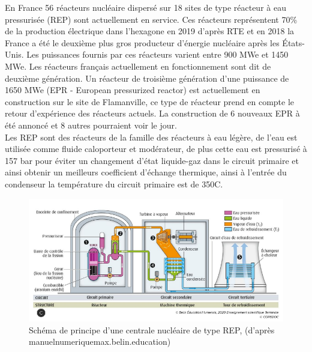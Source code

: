 \documentclass[a4paper,11pt,fleqn]{report}    %
\begin{document}
En France 56 réacteurs nucléaire dispersé sur 18 sites de type réacteur à eau pressurisée (REP) sont actuellement en service. Ces réacteurs représentent 70\% de la production électrique dans l'hexagone en 2019 d'après RTE et en 2018 la France a été le deuxième plus gros producteur d'énergie nucléaire après les États-Unis. Les puissances fournis par ces réacteurs varient entre 900 MWe et 1450 MWe. Les réacteurs français actuellement en fonctionnement sont dit de deuxième génération. Un réacteur de troisième génération d'une puissance de 1650 MWe (EPR - European pressurized reactor) est actuellement en construction sur le site de Flamanville, ce type de réacteur prend en compte le retour d'expérience des réacteurs actuels. La construction de 6 nouveaux EPR à été annoncé et 8 autres pourraient voir le jour. \\


Les REP sont des réacteurs de la famille des réacteurs à eau légère, de l'eau est utilisée comme fluide caloporteur et modérateur, de plus cette eau est pressurisé à 157 bar pour éviter un changement d'état liquide-gaz dans le circuit primaire et ainsi obtenir un meilleurs coefficient d'échange thermique, ainsi à l'entrée du condenseur la température du circuit primaire est de 350\textdegree C.
\begin{figure}[h!]
	\centering
	\includegraphics[width=0.8\linewidth]{figure/sch_centrale1}
	\caption[Schéma de principe d'une centrale nucléaire de type REP]{Schéma de principe d'une centrale nucléaire de type REP, (d'après manuelnumeriquemax.belin.education)}
	\label{fig:schcentrale1}
\end{figure}
\end{document}
